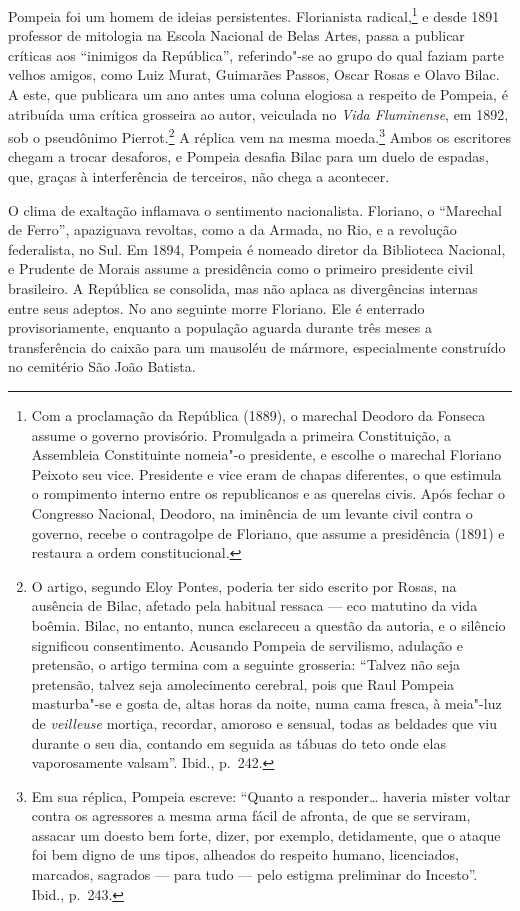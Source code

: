 Pompeia foi um homem de ideias persistentes. Florianista
radical,\footnote{Com a proclamação da República (1889), o marechal
Deodoro da Fonseca assume o governo provisório. Promulgada a primeira
Constituição, a Assembleia Constituinte nomeia"-o presidente, e
escolhe o marechal Floriano Peixoto seu vice. Presidente e vice eram de
chapas diferentes, o que estimula o rompimento interno entre os
republicanos e as querelas civis. Após fechar o Congresso Nacional,
Deodoro, na iminência de um levante civil contra o governo, recebe o
contragolpe de Floriano, que assume a presidência (1891) e restaura a
ordem constitucional.} e desde 1891 professor de
mitologia na Escola Nacional de Belas Artes, passa a publicar críticas
aos ``inimigos da República'', referindo"-se ao grupo do qual faziam
parte velhos amigos, como Luiz Murat, Guimarães Passos, Oscar Rosas e
Olavo Bilac. A este, que publicara um ano antes uma coluna elogiosa a
respeito de Pompeia, é atribuída uma crítica grosseira ao autor,
veiculada no \textit{Vida Fluminense}, em
1892, sob o pseudônimo Pierrot.\footnote{O artigo,
segundo Eloy Pontes, poderia ter sido escrito por Rosas, na ausência de
Bilac, afetado pela habitual ressaca --- eco matutino da vida boêmia.
Bilac, no entanto, nunca esclareceu a questão da autoria, e o silêncio
significou consentimento. Acusando Pompeia de servilismo, adulação e
pretensão, o artigo termina com a seguinte grosseria: ``Talvez não seja
pretensão, talvez seja amolecimento cerebral, pois que Raul Pompeia
masturba"-se e gosta de, altas horas da noite, numa cama fresca, à
meia"-luz de \textit{veilleuse} mortiça,
recordar, amoroso e sensual, todas as beldades que viu durante o seu
dia, contando em seguida as tábuas do teto onde elas vaporosamente
valsam''. Ibid., p.~242.} A réplica vem na mesma
moeda.\footnote{ Em sua réplica, Pompeia escreve:
``Quanto a responder\ldots{} haveria mister voltar contra os agressores a
mesma arma fácil de afronta, de que se serviram, assacar um doesto bem
forte, dizer, por exemplo, detidamente, que o ataque foi bem digno de 
uns tipos, alheados do respeito humano, licenciados, marcados, sagrados 
--- para tudo --- pelo estigma preliminar do Incesto''. Ibid., p.~243.} 
Ambos os escritores chegam a trocar desaforos, e
Pompeia desafia Bilac para um duelo de espadas, que, graças à
interferência de terceiros, não chega a acontecer. 

O clima de exaltação inflamava o sentimento nacionalista. Floriano, o
``Marechal de Ferro'', apaziguava revoltas, como a da Armada, no Rio, e a
revolução federalista, no Sul. Em 1894, Pompeia é nomeado diretor da
Biblioteca Nacional, e Prudente de Morais assume a presidência como o
primeiro presidente civil brasileiro. A República se consolida, mas não
aplaca as divergências internas entre seus adeptos. No ano seguinte
morre Floriano. Ele é enterrado provisoriamente, enquanto a população
aguarda durante três meses a transferência do caixão para um mausoléu
de mármore, especialmente construído no cemitério São João Batista.

